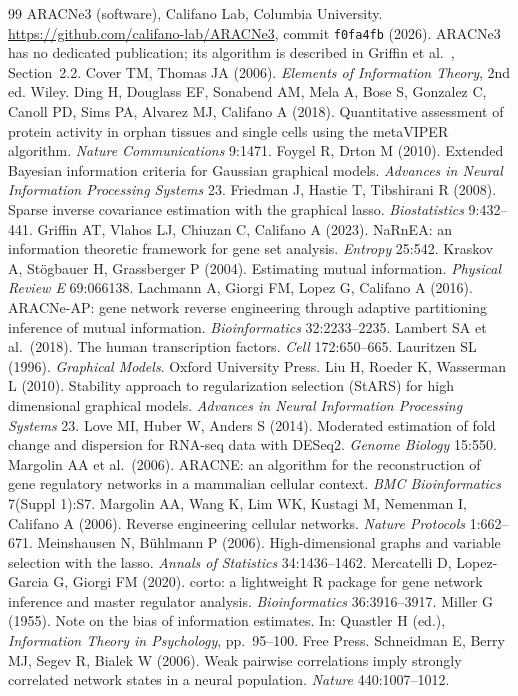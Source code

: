 \documentclass[11pt,a4paper]{article}
\theoremstyle{plain}
\theoremstyle{remark}
\begin{document}
\begin{thebibliography}{99}\small
{} ARACNe3 (software), Califano Lab, Columbia University. \url{https://github.com/califano-lab/ARACNe3}, commit \texttt{f0fa4fb} (2026).
  ARACNe3 has no dedicated publication; its algorithm is described in Griffin et al.~\cite{griffin2023}, Section~2.2.
 Cover TM, Thomas JA (2006). \emph{Elements of Information Theory}, 2nd ed. Wiley.
 Ding H, Douglass EF, Sonabend AM, Mela A, Bose S, Gonzalez C, Canoll PD, Sims PA, Alvarez MJ, Califano A (2018). Quantitative assessment of protein activity in orphan tissues and single cells using the metaVIPER algorithm. \emph{Nature Communications} 9:1471.
 Foygel R, Drton M (2010). Extended Bayesian information criteria for Gaussian graphical models. \emph{Advances in Neural Information Processing Systems} 23.
 Friedman J, Hastie T, Tibshirani R (2008). Sparse inverse covariance estimation with the graphical lasso. \emph{Biostatistics} 9:432--441.
 Griffin AT, Vlahos LJ, Chiuzan C, Califano A (2023). NaRnEA: an information theoretic framework for gene set analysis. \emph{Entropy} 25:542.
 Kraskov A, St\"ogbauer H, Grassberger P (2004). Estimating mutual information. \emph{Physical Review E} 69:066138.
 Lachmann A, Giorgi FM, Lopez G, Califano A (2016). ARACNe-AP: gene network reverse engineering through adaptive partitioning inference of mutual information. \emph{Bioinformatics} 32:2233--2235.
 Lambert SA et al.\ (2018). The human transcription factors. \emph{Cell} 172:650--665.
 Lauritzen SL (1996). \emph{Graphical Models}. Oxford University Press.
 Liu H, Roeder K, Wasserman L (2010). Stability approach to regularization selection (StARS) for high dimensional graphical models. \emph{Advances in Neural Information Processing Systems} 23.
 Love MI, Huber W, Anders S (2014). Moderated estimation of fold change and dispersion for RNA-seq data with DESeq2. \emph{Genome Biology} 15:550.
 Margolin AA et al.\ (2006). ARACNE: an algorithm for the reconstruction of gene regulatory networks in a mammalian cellular context. \emph{BMC Bioinformatics} 7(Suppl 1):S7.
 Margolin AA, Wang K, Lim WK, Kustagi M, Nemenman I, Califano A (2006). Reverse engineering cellular networks. \emph{Nature Protocols} 1:662--671.
 Meinshausen N, B\"uhlmann P (2006). High-dimensional graphs and variable selection with the lasso. \emph{Annals of Statistics} 34:1436--1462.
 Mercatelli D, Lopez-Garcia G, Giorgi FM (2020). corto: a lightweight R package for gene network inference and master regulator analysis. \emph{Bioinformatics} 36:3916--3917.
 Miller G (1955). Note on the bias of information estimates. In: Quastler H (ed.), \emph{Information Theory in Psychology}, pp.\ 95--100. Free Press.
 Schneidman E, Berry MJ, Segev R, Bialek W (2006). Weak pairwise correlations imply strongly correlated network states in a neural population. \emph{Nature} 440:1007--1012.


\end{thebibliography}
\end{document}
